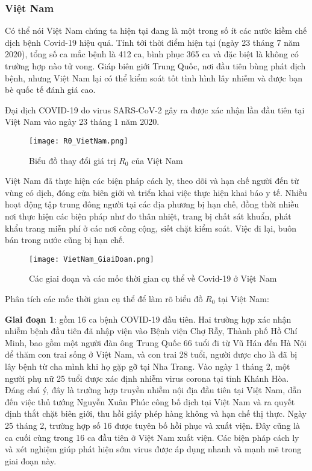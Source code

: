 \documentclass[a4paper]{article}
\begin{document}
\subsubsection{Việt Nam}
Có thể nói Việt Nam chúng ta hiện tại đang là một trong số ít các nước kiềm chế dịch bệnh Covid-19 hiệu quả. Tính tới thời điểm hiện tại (ngày 23 tháng 7 năm 2020), tổng số ca mắc bệnh là 412 ca, bình phục 365 ca và đặc biệt là không có trường hợp nào tử vong. Giáp biên giới Trung Quốc, nơi đầu tiên bùng phát dịch bệnh, nhưng Việt Nam lại có thể kiểm soát tốt tình hình lây nhiễm và được bạn bè quốc tế đánh giá cao.

Đại dịch COVID-19 do virus SARS-CoV-2 gây ra được xác nhận lần đầu tiên tại Việt Nam vào ngày 23 tháng 1 năm 2020.

\begin{figure}[h!]
    \centering
    \texttt{[image: R0\_VietNam.png]}
    \newline
    \caption{ Biểu đồ thay đổi giá trị $R_0$ của Việt Nam }
\end{figure}

Việt Nam đã thực hiện các biện pháp cách ly, theo dõi và hạn chế người đến từ vùng có dịch, đóng cửa biên giới và triển khai việc thực hiện khai báo y tế. Nhiều hoạt động tập trung đông người tại các địa phương bị hạn chế, đồng thời nhiều nơi thực hiện các biện pháp như đo thân nhiệt, trang bị chất sát khuẩn, phát khẩu trang miễn phí ở các nơi công cộng, siết chặt kiểm soát. Việc đi lại, buôn bán trong nước cũng bị hạn chế.

\begin{figure}[h!]
    \centering
    \texttt{[image: VietNam\_GiaiDoan.png]}
    \newline
    \caption{ Các giai đoạn và các mốc thời gian cụ thể về Covid-19 ở Việt Nam }
\end{figure}


Phân tích các mốc thời gian cụ thể để làm rõ biểu đồ $R_0$ tại Việt Nam: 

\textbf{Giai đoạn 1}: gồm 16 ca bệnh COVID-19 đầu tiên. Hai trường hợp xác nhận nhiễm bệnh đầu tiên đã nhập viện vào Bệnh viện Chợ Rẫy, Thành phố Hồ Chí Minh, bao gồm một người đàn ông Trung Quốc 66 tuổi đi từ Vũ Hán đến Hà Nội để thăm con trai sống ở Việt Nam, và con trai 28 tuổi, người được cho là đã bị lây bệnh từ cha mình khi họ gặp gỡ tại Nha Trang. Vào ngày 1 tháng 2, một người phụ nữ 25 tuổi được xác định nhiễm virus corona tại tỉnh Khánh Hòa. Đáng chú ý, đây là trường hợp truyền nhiễm nội địa đầu tiên tại Việt Nam, dẫn đến việc thủ tướng Nguyễn Xuân Phúc công bố dịch tại Việt Nam và ra quyết định thắt chặt biên giới, thu hồi giấy phép hàng không và hạn chế thị thực. Ngày 25 tháng 2, trường hợp số 16 được tuyên bố hồi phục và xuất viện. Đây cũng là ca cuối cùng trong 16 ca đầu tiên ở Việt Nam xuất viện. Các biện pháp cách ly và xét nghiệm giúp phát hiện sớm virus được áp dụng nhanh và mạnh mẽ trong giai đoạn này. 
\end{document}
